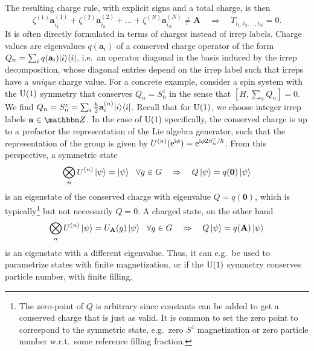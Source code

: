 The resulting charge rule, with explicit signs and a total charge, is then
%
\begin{equation}
    \label{eq:tensornets:symmetries:charge_rule_general}
    \zeta^{(1)} \mathbf{a}^{(1)}_{i_1} + \zeta^{(2)} \mathbf{a}^{(2)}_{i_2} + \dots + \zeta^{(N)} \mathbf{a}^{(N)}_{i_N} \neq \mathbf{A}
    \quad \Rightarrow \quad
    T_{i_1,i_2,\dots, i_N} = 0
    .
\end{equation}
%
It is often directly formulated in terms of charges instead of irrep labels.
%
Charge values are eigenvalues $q(\mathbf{a}_i)$ of a conserved charge operator of the form $Q_n = \sum_i q(\mathbf{a}_i) \ketbra{i}{i}$, i.e.~an operator diagonal in the basis induced by the irrep decomposition, whose diagonal entries depend on the irrep label such that irreps have a \emph{unique} charge value.
%
For a concrete example, consider a spin system with the $\mathrm{U}(1)$ symmetry that conserves $Q_n = S_n^z$ in the sense that $[H, \sum_n Q_n] = 0$.
%
We find $Q_n = S_n^z = \sum_i \tfrac{\hbar}{2} \mathbf{a}^{(n)}_i \ketbra{i}{i}$.
%
Recall that for $\mathrm{U}(1)$, we choose integer irrep labels $\mathbf{a} \in \Zbb$.
%
In the case of $\mathrm{U}(1)$ specifically, the conserved charge is up to a prefactor the representation of the Lie algebra generator, such that the representation of the group is given by $U^{(n)}(\mathrm{e}^{\mathrm{i}\phi}) = \mathrm{e}^{\mathrm{i}\phi 2 S_n^z / \hbar}$.
%
From this perspective, a symmetric state
\begin{equation}
    \bigotimes_n U^{(n)} \psiket = \psiket ~~ \forall g \in G
    \quad \Rightarrow \quad
    Q \psiket = q(\mathbf{0}) \psiket
\end{equation}
is an eigenstate of the conserved charge with eigenvalue $Q = q(\mathbf{0})$, which is typically\footnote{
    The zero-point of $Q$ is arbitrary since constants can be added to get a conserved charge that is just as valid.
    It is common to set the zero point to correspond to the symmetric state, e.g.~zero $S^z$ magnetization or zero particle number w.r.t.~some reference filling fraction.
} but not necessarily $Q = 0$.
%
A charged state, on the other hand
\begin{equation}
    \bigotimes_n U^{(n)} \psiket = U_\mathbf{A}(g) \psiket ~~ \forall g \in G
    \quad \Rightarrow \quad
    Q \psiket = q(\mathbf{A}) \psiket
\end{equation}
is an eigenstate with a different eigenvalue.
%
Thus, it can e.g.~be used to parametrize states with finite magnetization, or if the $\mathrm{U}(1)$ symmetry conserves particle number, with finite filling.

